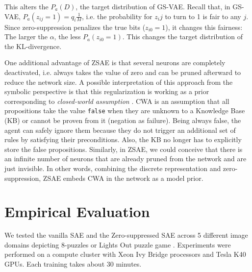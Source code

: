 This alters the $P_a(D)$, the target distribution of GS-VAE.
Recall that, in GS-VAE, $P_a(z_{ij}=1)=q_i\frac{1}{M}$, i.e. the probability for $z_ij$ to turn to 1 is fair to any $j$.
Since zero-suppression penalizes the true bits ($z_{i0}=1$), it changes this fairness: The larger the $\alpha$,
the less $P_a(z_{i0}=1)$. This changes the target distribution of the KL-divergence.

One additional advantage of ZSAE is that
several neurons are completely deactivated, i.e. always takes the value of zero
and can be pruned afterward to reduce the network size.
% 
A possible interpretation of this approach from the symbolic perspective is that
this regularization is working as a prior corresponding to \emph{closed-world assumption} \cite[CWA]{reiter1981closed}.
CWA is an assumption that all propositions take the value \texttt{false}
when they are unknown to a Knowledge Base (KB) or cannot be proven from it (negation as failure).
Being always false, the agent can safely ignore them because
they do not trigger an additional set of rules by satisfying their preconditions.
Also, the KB no longer has to explicitly store the false propositions.
% 
Similarly, in ZSAE, we could conceive that there is an infinite number of neurons
that are already pruned from the network and are just invisible.
In other words, combining the discrete representation and zero-suppression,
ZSAE embeds CWA in the network as a model prior.


\section{Empirical Evaluation}
\label{evaluation}

We tested the vanilla SAE and the Zero-suppressed SAE across 5 different
image domains depicting 8-puzzles or Lights Out puzzle game \cite{lightsout}.
Experiments were performed on a compute cluster with Xeon Ivy Bridge
processors and Tesla K40 GPUs.  Each training takes about 30 minutes.

